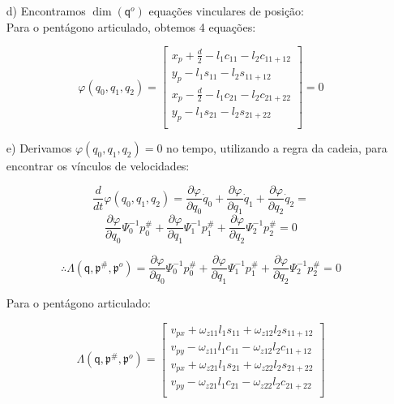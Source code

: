 \documentclass[12pt,a4paper]{article}
\begin{document}
\begin{itemize}
\begin{itemize}
	\item[d)] Encontramos $\dim (\mathsf{q}^o)$ equações vinculares de posição: \\	
	
	Para o pentágono articulado, obtemos 4 equações:
	
	\begin{equation}
	\varphi(q_0,q_1,q_2) =
	\begin{bmatrix}
	x_p +\frac{d}{2} - l_1 c_{11} - l_2 c_{11+12} \\
	y_p - l_1 s_{11} - l_2 s_{11+12} \\
	x_p - \frac{d}{2} - l_1 c_{21} - l_2 c_{21+22} \\
	y_p - l_1 s_{21} - l_2 s_{21+22} \\
	\end{bmatrix}
	= 0
	\end{equation}
	
	\item[e)] Derivamos $\varphi(q_0,q_1,q_2) = 0$ no tempo, utilizando a regra da cadeia, para encontrar os vínculos de velocidades:
	
	$$ \frac{d}{dt}\varphi(q_0,q_1,q_2) = \frac{\partial \varphi}{\partial q_0} \dot{q}_0 + \frac{\partial \varphi}{\partial q_1} \dot{q}_1 + \frac{\partial \varphi}{\partial q_2} \dot{q}_2 = $$
	$$\frac{\partial \varphi}{\partial q_0} \Psi_0^{-1} p_0^{\#} + \frac{\partial \varphi}{\partial q_1} \Psi_1^{-1} p_1^{\#} + \frac{\partial \varphi}{\partial q_2} \Psi_2^{-1} p_2^{\#} = 0 $$
	
	\begin{equation}
	\therefore \mathsf{\Lambda}(\mathsf{q}, \mathfrak{p}^{\#}, \mathfrak{p}^o) =  \frac{\partial \varphi}{\partial q_0} \Psi_0^{-1} p_0^{\#} + \frac{\partial \varphi}{\partial q_1} \Psi_1^{-1} p_1^{\#} + \frac{\partial \varphi}{\partial q_2} \Psi_2^{-1} p_2^{\#} = 0 
	\end{equation}
	
	Para o pentágono articulado:
	
	\begin{equation}
	\mathsf{\Lambda}(\mathsf{q}, \mathfrak{p}^{\#}, \mathfrak{p}^o) =
	\begin{bmatrix}
	v_{px} + \omega_{z11} l_1 s_{11}  + \omega_{z12} l_2 s_{11+12}  \\
	v_{py} - \omega_{z11} l_1 c_{11}  - \omega_{z12} l_2 c_{11+12} \\
	v_{px} + \omega_{z21} l_1 s_{21}  + \omega_{z22} l_2 s_{21+22} \\
	v_{py} - \omega_{z21} l_1 c_{21}  - \omega_{z22} l_2 c_{21+22} \\
	\end{bmatrix}
	\end{equation}
	

\end{itemize}
\end{itemize}
\end{document}
